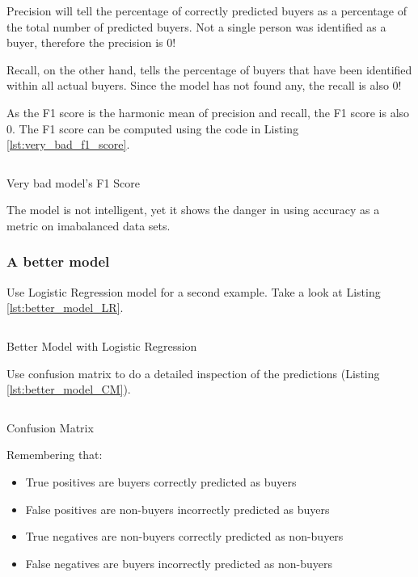 Precision will tell the percentage of correctly predicted buyers as a
percentage of the total number of predicted buyers. Not a single person
was identified as a buyer, therefore the precision is 0!

Recall, on the other hand, tells the percentage of buyers that have been
identified within all actual buyers. Since the model has not found any,
the recall is also 0!

As the F1 score is the harmonic mean of precision and recall, the F1
score is also 0. The F1 score can be computed using the code in Listing
\ref{lst:very_bad_f1_score}.

\begin{listing}[htp]
  \inputminted{python}{code/very_bad_f1_score.py}
  \caption{Very bad model's F1 Score}
  \label{lst:very_bad_f1_score}
\end{listing}

The model is not intelligent, yet it shows the danger in using accuracy
as a metric on imabalanced data sets.

\hypertarget{a-better-model}{%
\subsubsection{A better model}\label{a-better-model}}

Use Logistic Regression model for a second example. Take a look at
Listing \ref{lst:better_model_LR}.

\begin{listing}[htp]
  \inputminted{python}{code/better_model_LR.py}
  \caption{Better Model with Logistic Regression}
  \label{lst:better_model_LR}
\end{listing}

Use confusion matrix to do a detailed inspection of the predictions
(Listing \ref{lst:better_model_CM}).

\begin{listing}[htp]
  \inputminted{python}{code/better_model_CM.py}
  \caption{Confusion Matrix}
  \label{lst:better_model_CM}
\end{listing}

Remembering that:

\begin{itemize}
\item
  True positives are buyers correctly predicted as buyers
\item
  False positives are non-buyers incorrectly predicted as buyers
\item
  True negatives are non-buyers correctly predicted as non-buyers
\item
  False negatives are buyers incorrectly predicted as non-buyers
\end{itemize}

